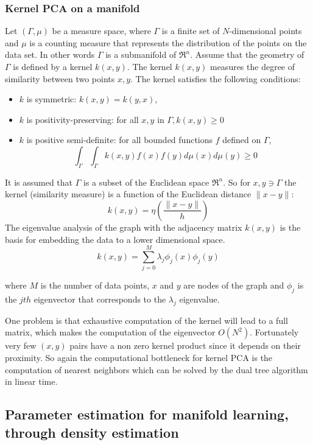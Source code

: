 \documentclass[12pt,letterpaper,doublespaced,ETD,dvips,proposal]{gtthesis}
\begin{document}
\begin{Body}
\subsubsection{Kernel PCA on a manifold}
\label{Kernel_PCA_on_a_manifold}

Let  $(\Gamma,\mu)$ be a measure space, where $\Gamma$ is a finite
set of $N$-dimensional points and $\mu$ is a counting measure that
represents the distribution of the points on the data set. In other
words $\Gamma$ is a submanifold of $\Re^{n}$. Assume that the
geometry of $\Gamma$ is defined by a kernel $k(x,y)$. The kernel
$k(x,y)$ measures the degree of similarity between two points $x,y$.
The kernel satisfies the following conditions:
\begin{itemize}
    \item   $k$ is symmetric: $k(x,y)=k(y,x)$,
    \item   $k$ is positivity-preserving: for all $x,y$ in
$\Gamma, k(x,y)\geq 0$
    \item   $k$ is positive semi-definite: for all bounded
functions $f$ defined on  $\Gamma$,
\[
\int_{\Gamma} \int_{\Gamma} k(x,y)f(x)f(y)d\mu(x)d\mu(y)\geq 0\]
\end{itemize}
It is assumed that $\Gamma$ is a subset of the Euclidean space
$\Re^{n}$. So for $x,y\ni\Gamma$ the kernel (similarity measure) is
a function of the Euclidean distance $\parallel x-y\parallel:$
\[
 k(x,y)=\eta\left(\frac{\parallel x-y\parallel}{h}\right)
\]
The eigenvalue analysis of the graph with the adjacency matrix
$k(x,y)$ is the basis for embedding the data to a lower dimensional
space.
\[
    k(x,y)=\sum_{j=0}^{M} \lambda_{j}\phi_{j}(x)\phi_{j}(y)
\]

where $M$ is the number of data points, $x$ and $y$ are nodes of the
graph and $\phi_j$ is the $jth$ eigenvector that corresponds to the
$\lambda_j$ eigenvalue.

One problem is that exhaustive computation of the kernel will lead
to a full matrix, which makes the computation of the eigenvector
$O(N^2)$. Fortunately very few $(x,y)$ pairs have a non zero kernel
product since it depends on their proximity. So again the
computational bottleneck for kernel PCA is the computation of
nearest neighbors which can be solved by the dual tree algorithm in
linear time.

\subsection{Parameter estimation for manifold learning, through density estimation}


\end{Body}
\end{document}

